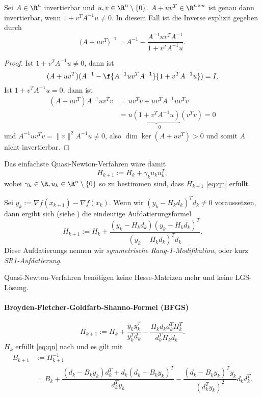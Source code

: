 \begin{lem} \label{2.55}
	Sei $A \in \R^n$ invertierbar und $u, v \in \R^n \setminus \{0\}$.
	$A + uv^T \in \R^{n\times n}$ ist genau dann invertierbar, wenn $1 + v^T A^{-1} u \neq 0$.
	In diesem Fall ist die Inverse explizit gegeben durch
	\[
		\big(A + uv^T\big)^{-1} = A^{-1} - \dfrac {A^{-1} u v^T A^{-1}}{1 + v^T A^{-1} u}.
	\]
	\begin{proof}
		Ist $1 + v^T A^{-1} u \neq 0$, dann ist
		\[
			(A + uv^T)(A^{-1} - \f {A^{-1} uv^T A^{-1}}{1 + v^T A^{-1} u} ) = I.
		\]
		Ist $1 + v^T A^{-1} u = 0$, dann ist
		\begin{align*}
			(A + uv^T) A^{-1} uv^Tv
			&= uv^Tv + uv^TA^{-1} uv^Tv \\
			&= u \underbrace{(1 + v^TA^{-1}u)}_{=0} (v^Tv)
			= 0
		\end{align*}
		und $A^{-1} uv^Tv = \|v\|^2 A^{-1} u \neq 0$, also $\dim \ker (A + uv^T) > 0$ und somit $A$ nicht invertierbar.
	\end{proof}
\end{lem}

Das einfachste Quasi-Newton-Verfahren wäre damit
\[
	H_{k+1} := H_k + \gamma_k u_k u_k^T,
\]
wobei $\gamma_k \in \R, u_k \in \R^n \setminus \{0\}$ so zu bestimmen sind, dass $H_{k+1}$ \eqref{eq:qn} erfüllt.

Sei $y_k := \nabla f(x_{k+1}) - \nabla f(x_k)$.
Wenn wir $(y_k - H_k d_k)^T d_k \neq 0$ voraussetzen, dann ergibt sich (siehe ) die eindeutige Aufdatierungsformel
\[
	H_{k+1} := H_k + \dfrac{(y_k - H_k d_k)(y_k - H_k d_k)^T}{(y_k - H_k d_k)^T d_k}.
\]
Diese Aufdatierungs nennen wir \emph{symmetrische Rang-1-Modifikation}, oder kurz \emph{SR1-Aufdatierung}.



Quasi-Newton-Verfahren benötigen keine Hesse-Matrizen mehr und keine LGS-Lösung.

\paragraph{Broyden-Fletcher-Goldfarb-Shanno-Formel (BFGS)}

\[
	H_{k+1} := H_k + \dfrac {y_ky_k^T}{y_k^T d_k} - \dfrac {H_k d_k d_k^T H_k^T}{d_k^T H_k d_k}.
\]
$H_k$ erfüllt \eqref{eq:qn} nach  und es gilt mit 
\begin{align*}
	B_{k+1} &:= H_{k+1}^{-1} \\
	&= B_k + \dfrac {(d_k-B_ky_k)d_k^T + d_k(d_k-B_ky_k)^T}{d_k^T y_k} - \dfrac {(d_k-B_ky_k)^T y_k}{(d_k^T y_k)^2} d_k d_k^T.
\end{align*}

